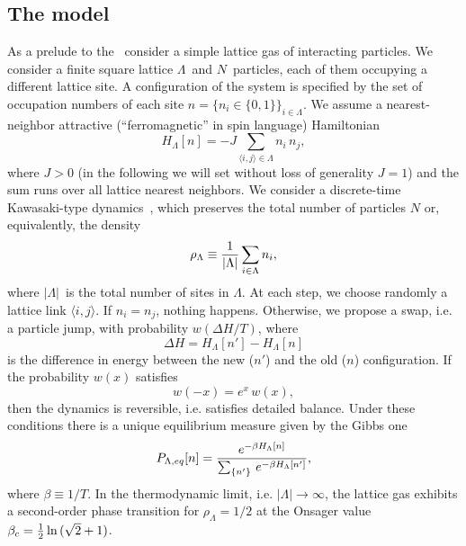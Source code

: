 \documentclass[12pt]{article}
\begin{document}
\subsection{The model}
\label{sec-2.1}
As a prelude to the \dlg\,
consider a simple lattice gas of interacting particles. We
consider a finite square lattice $\Lambda$\ 
and $N$\ particles, each of them occupying a different lattice site. A
configuration of the system is specified by the set of
occupation numbers of each site 
$
        n = \{n_{i} \in \{0,1\}\}_{i\in\Lambda}.
$
We assume a nearest-neighbor attractive (``ferromagnetic'' in spin language)
Hamiltonian 
\begin{equation}
        H_{\Lambda}[n]=-J\sum_{\langle i,j \rangle\in\Lambda} n_{i}\,n_{j},
\end{equation} 
where $J>0$ (in the following we will set without loss of generality 
$J=1$) and the sum runs over all lattice nearest neighbors. 
We consider a discrete-time Kawasaki-type dynamics~\cite{Kawasaki},
which preserves the total number of particles $N$ or, 
equivalently, the density 
\begin{equation}
        \rho_{\Lambda} \equiv  \frac{1}{|\Lambda|}\sum_{i\in\Lambda} n_{i},
\end{equation}
where $|\Lambda|$\ is the total number of sites in $\Lambda$.
At each step, we choose randomly a lattice link $\langle i,j \rangle$. 
If $n_i = n_j$, nothing happens. Otherwise, we propose a swap, i.e. 
a particle jump, with probability $w(\Delta H/T)$, where 
\begin{equation}
        \Delta H = H_\Lambda[n'] - H_\Lambda[n]
\end{equation}
is the difference in energy between the new ($n'$) and the old ($n$) 
configuration. If the probability $w(x)$ satisfies
\begin{equation}
        w(-x)=e^{x}\,w(x),
\end{equation} 
then the dynamics is reversible, i.e. satisfies detailed balance.
Under these conditions there is a unique equilibrium measure
given by the Gibbs one
\begin{equation}
        P_{\Lambda,eq}[n]=\frac{e^{-\beta
        H_\Lambda[n]}}{\sum_{\{n'\}}\,e^{-\beta H_\Lambda[n']}} ,
\end{equation} 
where $\beta \equiv 1/T$.
In the thermodynamic limit, i.e. $|\Lambda|\rightarrow \infty$, 
the lattice gas exhibits a second-order phase transition 
for $\rho_\Lambda = 1/2$ at the Onsager value
\mbox{$\beta_{c}=\frac{1}{2}\ln{ (\sqrt{2}+1)}$}. 
\end{document}
